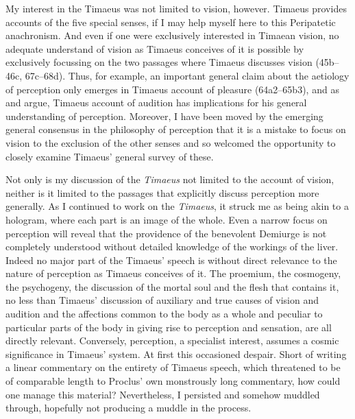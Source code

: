 My interest in the Timaeus was not limited to vision, however. Timaeus provides accounts of the five special senses, if I may help myself here to this Peripatetic anachronism. And even if one were exclusively interested in Timaean vision, no adequate understand of vision as Timaeus conceives of it is possible by exclusively focussing on the two passages where Timaeus discusses vision (45b–46c, 67c–68d). Thus, for example, an important general claim about the aetiology of perception only emerges in Timaeus account of pleasure (64a2–65b3), and as \citet{Barker:2000dy} and \citet{Lautner:2005aa} argue, Timaeus account of audition has implications for his general understanding of perception. Moreover, I have been moved by the emerging general consensus in the philosophy of perception that it is a mistake to focus on vision to the exclusion of the other senses and so welcomed the opportunity to closely examine Timaeus' general survey of these.

Not only is my discussion of the \emph{Timaeus} not limited to the account of vision, neither is it limited to the passages that explicitly discuss perception more generally. As I continued to work on the \emph{Timaeus}, it struck me as being akin to a hologram, where each part is an image of the whole. Even a narrow focus on perception will reveal that the providence of the benevolent Demiurge is not completely understood without detailed knowledge of the workings of the liver. Indeed no major part of the Timaeus' speech is without direct relevance to the nature of perception as Timaeus conceives of it. The proemium, the cosmogeny, the psychogeny, the discussion of the mortal soul and the flesh that contains it, no less than Timaeus' discussion of auxiliary and true causes of vision and audition and the affections common to the body as a whole and peculiar to particular parts of the body in giving rise to perception and sensation, are all directly relevant. Conversely, perception, a specialist interest, assumes a cosmic significance in Timaeus' system. At first this occasioned despair. Short of writing a linear commentary on the entirety of Timaeus speech, which threatened to be of comparable length to Proclus' own monstrously long commentary, how could one manage this material? Nevertheless, I persisted and somehow muddled through, hopefully not producing a muddle in the process.

